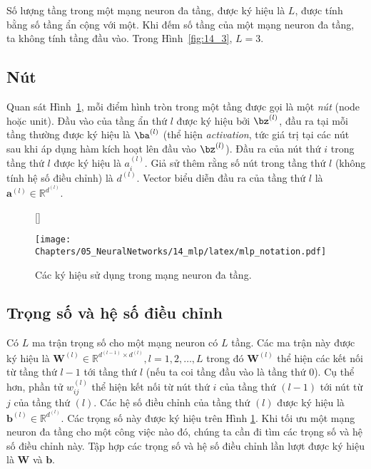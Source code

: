  
Số lượng tầng trong một mạng neuron đa tầng, được ký hiệu là $L$, được
tính bằng số tầng ẩn cộng với một. Khi đếm số tầng của một
mạng neuron đa tầng, ta không tính tầng đầu vào. Trong Hình~\ref{fig:14_3}, $L = 3$.
 
\subsection{Nút}
Quan sát Hình~\ref{fig:14_4}, mỗi điểm hình tròn trong một tầng được
gọi là một \textit{nút} (node hoặc unit). Đầu vào của tầng ẩn thứ $l$ được ký hiệu bởi $\bz^{(l)}$, đầu ra tại mỗi tầng thường được ký
hiệu là $\ba^{(l)}$ (thể hiện \textit{activation}, tức giá trị tại các nút sau
khi áp dụng hàm kích hoạt lên đầu vào $\bz^{(l)}$). Đầu ra của nút
thứ $i$ trong tầng thứ $l$ được ký hiệu là $a_i^{(l)}$. Giả sử thêm rằng số
nút trong tầng thứ $l$ (không tính hệ số điều chỉnh) là $d^{(l)}$. Vector biểu diễn đầu ra
của tầng thứ $l$ là $\mathbf{a}^{(l)} \in \mathbb{R}^{d^{(l)}}$.
 
 
 
\begin{figure}[t]
    [\FBwidth]
    {\caption{ 
    Các ký hiệu sử dụng trong mạng neuron đa tầng.
    }
    \label{fig:14_4}}
    { %
    \texttt{[image: Chapters/05\_NeuralNetworks/14\_mlp/latex/mlp\_notation.pdf]}
    }
\end{figure}

 
\subsection{Trọng số và hệ số điều chỉnh}
Có $L$ ma trận trọng số cho một mạng neuron có $L$ tầng. Các ma
trận này được ký hiệu là $\mathbf{W}^{(l)} \in \mathbb{R}^{d^{(l-1)}\times
d^{(l)}}, l = 1, 2, \dots, L$ trong đó $\mathbf{W}^{(l)}$ thể hiện các
{kết nối} từ tầng thứ $l-1$ tới tầng thứ $l$ (nếu ta coi tầng đầu vào là
tầng thứ $0$). Cụ thể hơn, phần tử $w^{(l)}_{ij}$ thể hiện kết nối từ nút thứ
$i$ của tầng thứ $(l-1)$ tới nút từ $j$ của tầng thứ $(l)$. Các hệ số điều chỉnh của
tầng thứ $(l)$ được ký hiệu là $\mathbf{b}^{(l)} \in \mathbb{R}^{d^{(l)}}$. Các
trọng số này được ký hiệu trên Hình \ref{fig:14_4}. Khi tối ưu một
mạng neuron đa tầng cho một công việc nào đó, chúng ta cần đi tìm các
trọng số và hệ số điều chỉnh này. Tập hợp các trọng số và hệ số điều chỉnh lần lượt được ký hiệu là
$\mathbf{W}$ và $\mathbf{b}$. 
 
